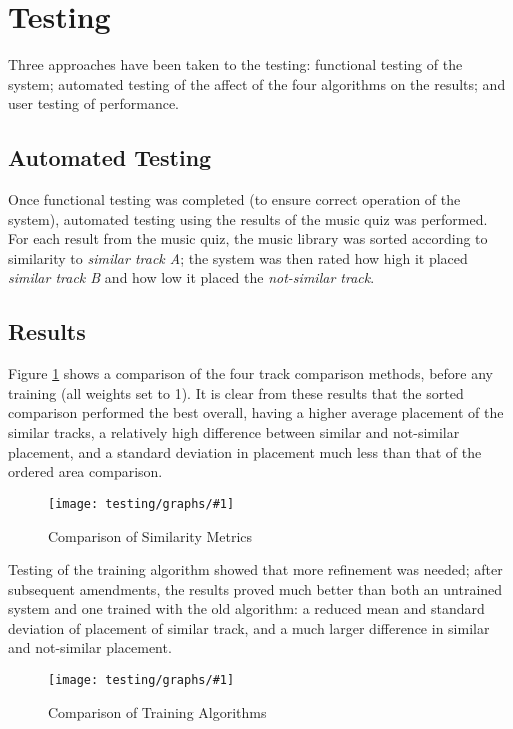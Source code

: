 \newcommand{\graph}[2]{
\begin{figure}[!hp]
	\caption{#2}
	\texttt{[image: testing/graphs/\#1]}
	\label{graph:#1}
\end{figure}}
\section{Testing}
\label{text:testing}
Three approaches have been taken to the testing: functional testing of the system; automated testing of the affect of the four algorithms on the results; and user testing of performance.
\subsection{Automated Testing}
Once functional testing was completed (to ensure correct operation of the system), automated testing using the results of the music quiz was performed. For each result from the music quiz, the music library was sorted according to similarity to \emph{similar track A}; the system was then rated how high it placed \emph{similar track B} and how low it placed the \emph{not-similar track}.
\subsection{Results}
Figure \ref{graph:metric-comparison} shows a comparison of the four track comparison methods, before any training (all weights set to 1). It is clear from these results that the sorted comparison performed the best overall, having a higher average placement of the similar tracks, a relatively high difference between similar and not-similar placement, and a standard deviation in placement much less than that of the ordered area comparison.
\graph{metric-comparison}{Comparison of Similarity Metrics}

Testing of the training algorithm showed that more refinement was needed; after subsequent amendments, the results proved much better than both an untrained system and one trained with the old algorithm: a reduced mean and standard deviation of placement of similar track, and a much larger difference in similar and not-similar placement.
\graph{training-algorithm-comparison}{Comparison of Training Algorithms}

